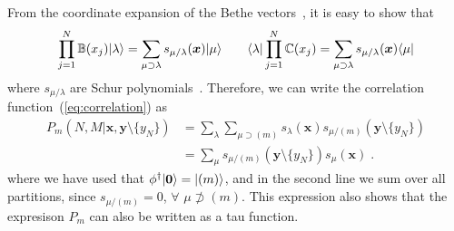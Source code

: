 \documentclass[a4paper,11pt]{amsart}
\begin{document}
From the coordinate expansion of the Bethe
vectors~\cite{Bogoliubov2005, Tsilevich:2006}, it is easy to show that
\begin{equation}
\prod_{j=1}^N \mathbb{B}(x_j)\lvert\lambda\rangle  = \sum_{\mu \supset \lambda } s_{\mu/\lambda}(\bm{x})\lvert\mu\rangle\qquad 
 \langle\lambda\rvert \prod_{j=1}^N \mathbb{C}(x_j) = \sum_{\mu \supset \lambda } s_{\mu/\lambda}(\bm{x})\langle\mu\rvert
\end{equation}
where \(s_{\mu/\lambda}\) are Schur polynomials~\cite{Macdonald:1998}.
Therefore, we can write the correlation function~(\ref{eq:correlation}) as 
\begin{equation}
\begin{split}
  P_m(N, M|\bm{x}, \bm{y}\setminus \{y_N\})
  & = \sum_\lambda \sum_{\mu \supset (m)} s_{\lambda}(\bm{x}) s_{\mu/(m)}(\bm{y}\setminus\{y_N\})\\
  & = \sum_\mu s_{\mu/(m)}(\bm{y}\setminus\{y_N\}) s_{\mu}(\bm{x})\; .
\end{split}
\end{equation}
where we have used that \(\phi^\dagger \lvert\bm{0}\rangle = \lvert(m)\rangle\), and in the second line
we sum over all partitions, since \(s_{\mu/(m)} = 0\), \(\forall \) \(\mu \not \supset (m)\).
This expression also shows that the expresison \(P_m\) can also be written as a tau function. 

\end{document}
